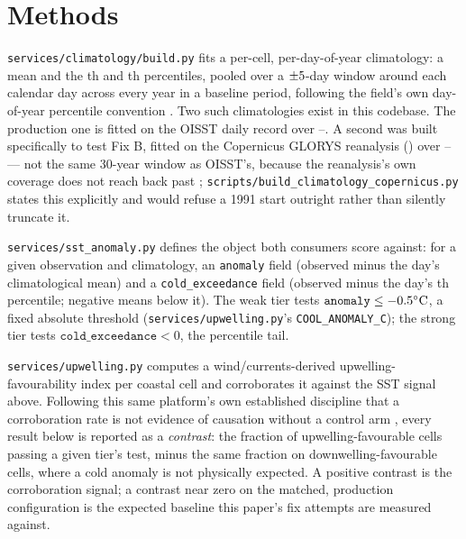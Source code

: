 \section{Methods}
\label{sec:methods}

{\raggedright\sloppy
{} \texttt{services/climatology/build.py} fits a
per-cell, per-day-of-year climatology: a mean and the \ClimPercentile{}th and
\ClimPercentileWarm{}th percentiles, pooled over a $\pm5{}$-day window around each
calendar day across every year in a baseline period, following the field's
own day-of-year percentile convention \citep{hobday2016}. Two such
climatologies exist in this codebase. The production one is fitted on the
OISST daily record over \OisstBaselineStart{}--\OisstBaselineEnd{}. A second
was built specifically to test Fix B, fitted on the Copernicus GLORYS
reanalysis (\texttt{\GlorysDatasetId{}}) over
\GlorysBaselineStart{}--\GlorysBaselineEnd{} --- not the same 30-year window
as OISST's, because the reanalysis's own coverage does not reach back past
\GlorysBaselineStart{}; \texttt{scripts/build\_climatology\_copernicus.py}
states this explicitly and would refuse a 1991 start outright rather than
silently truncate it.\par}

 \texttt{services/sst\_anomaly.py} defines the object
both consumers score against: for a given observation and climatology, an
\texttt{anomaly} field (observed minus the day's climatological mean) and a
\texttt{cold\_exceedance} field (observed minus the day's
\ClimPercentile{}th percentile; negative means below it). The weak tier tests
$\texttt{anomaly} \le -0.5{}\si{\celsius}$, a fixed absolute
threshold (\texttt{services/upwelling.py}'s \texttt{COOL\_ANOMALY\_C}); the
strong tier tests $\texttt{cold\_exceedance} < 0$, the percentile tail.

 \texttt{services/upwelling.py}
computes a wind/currents-derived upwelling-favourability index per coastal
cell and corroborates it against the SST signal above. Following this same
platform's own established discipline that a corroboration rate is not
evidence of causation without a control arm \citep{silentfailures2026}, every
result below is reported as a \emph{contrast}: the fraction of
upwelling-favourable cells passing a given tier's test, minus the same
fraction on downwelling-favourable cells, where a cold anomaly is not
physically expected. A positive contrast is the corroboration signal; a
contrast near zero on the matched, production configuration is the expected
baseline this paper's fix attempts are measured against.

